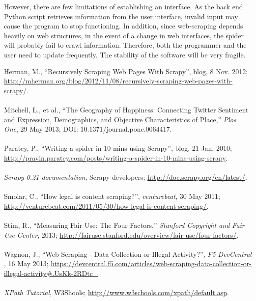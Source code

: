 \documentclass[12pt,twoside,draft]{report}
\begin{document}
However, there are few limitations of establishing an interface. As the back end Python script retrieves information from the user interface, invalid input may cause the program to stop functioning. In addition, since web-scraping depends heavily on web structures, in the event of a change in web interfaces, the spider will probably fail to crawl information. Therefore, both the programmer and the user need to update frequently. The stability of the software will be very fragile.


\newpage
\begin{appendices}
\cleardoublepage
\printglossaries
\end{appendices}
\cleardoublepage
\begin{thebibliography}{9}


Herman, M., ``Recursively Scraping Web Pages With Scrapy'', blog, 8 Nov. 2012; \url{http://mherman.org/blog/2012/11/08/recursively-scraping-web-pages-with-scrapy/}.\\\\

Mitchell, L., et al., ``The Geography of Happiness: Connecting Twitter Sentiment and Expression, Demographics, and Objective Characteristics of Place,'' \textit{Plos One}, 29 May 2013; DOI: 10.1371/journal.pone.0064417. \\\\

Paratey, P., ``Writing a spider in 10 mins using Scrapy'', blog, 21 Jan. 2010; \url{http://pravin.paratey.com/posts/writing-a-spider-in-10-mins-using-scrapy}.\\\\

\textit{Scrapy 0.21 documentation}, Scrapy developers; \url{http://doc.scrapy.org/en/latest/}.\\\\

Smolar, C., ``How legal is content scraping?'', \textit{venturebeat}, 30 May 2011; \url{http://venturebeat.com/2011/05/30/how-legal-is-content-scraping/}.\\\\

Stim, R., ``Measuring Fair Use: The Four Factors,'' \textit{Stanford Copyright and Fair Use Center}, 2013; \url{http://fairuse.stanford.edu/overview/fair-use/four-factors/}. \\\\

Wagnon, J., ``Web Scraping - Data Collection or Illegal Activity?'', \textit{F5 DevCentral }, 16 May 2013; \url{https://devcentral.f5.com/articles/web-scraping-data-collection-or-illegal-activity#.UsKk-2RDtc_}.\\\\

\textit{XPath Tutorial}, W3Shools; \url{http://www.w3schools.com/xpath/default.asp}.\\\\


\end{thebibliography}
\end{document}
